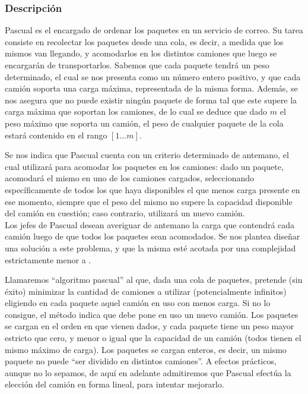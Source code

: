 \documentclass[11pt, a4paper, twoside]{article}
\begin{document}
{}

\subsubsection{Descripción}

Pascual es el encargado de ordenar los paquetes en un servicio de correo. 
Su tarea consiste en recolectar los paquetes desde una cola, es decir, 
a medida que los mismos van llegando, y acomodarlos en los distintos 
camiones que luego se encargarán de transportarlos. Sabemos que cada paquete 
tendrá un peso determinado, el cual se nos presenta como un número entero 
positivo, y que cada camión soporta una carga máxima, representada de la misma forma. 
Además, se nos asegura que no puede existir ningún paquete de forma tal que este 
supere la carga máxima que soportan los camiones, de lo cual se deduce que
dado $m$ el peso máximo que soporta un camión, el peso de cualquier paquete
de la cola estará contenido en el rango $[1...m]$.

Se nos indica que Pascual cuenta con un criterio determinado de antemano, el cual
utilizará para acomodar los paquetes en los camiones: dado un paquete, acomodará
el mismo en uno de los camiones cargados, seleccionando específicamente de todos los que
haya disponibles el que menos carga presente en ese momento, siempre que el peso del mismo 
no supere la capacidad disponible del camión en cuestión; caso contrario, utilizará 
un nuevo camión.\\

Los jefes de Pascual desean averiguar de antemano la carga que contendrá cada camión
luego de que todos los paquetes sean acomodados. Se nos plantea diseñar una solución
a este problema, y que la misma esté acotada por una complejidad estrictamente menor 
a .

Llamaremos \enquote{algoritmo pascual} al que, dada una cola de paquetes, pretende 
(sin éxito) minimizar la cantidad de camiones a utilizar (potencialmente infinitos)
eligiendo en cada paquete aquel camión en uso con menos carga. Si no lo consigue, 
el método indica que debe pone en uso un nuevo camión. Los paquetes se cargan en 
el orden en que vienen dados, y cada paquete tiene un peso mayor estricto que cero, 
y menor o igual que la capacidad de un camión (todos tienen el mismo máximo de carga). 
Los paquetes se cargan enteros, es decir, un mismo paquete no puede \enquote{ser dividido 
en distintos camiones}. A efectos prácticos, aunque no lo sepamos, de aquí en
adelante admitiremos que Pascual efectúa la elección del camión en forma lineal,
para intentar mejorarlo.
\end{document}
